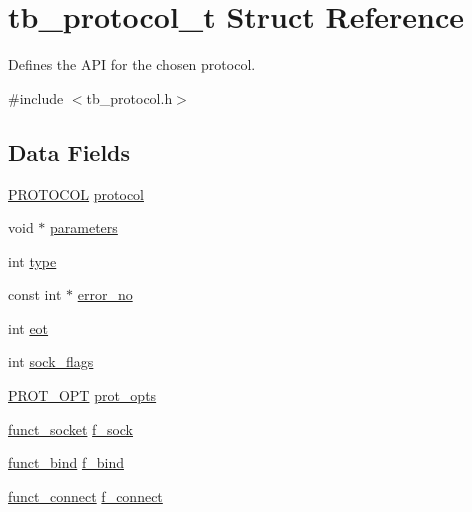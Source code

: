 \hypertarget{structtb__protocol__t}{\section{tb\-\_\-protocol\-\_\-t Struct Reference}
\label{structtb__protocol__t}
}


Defines the A\-P\-I for the chosen protocol.  




{\ttfamily \#include $<$tb\-\_\-protocol.\-h$>$}

\subsection*{Data Fields}
\begin{DoxyCompactItemize}
\item 
\hyperlink{tb__protocol_8h_a7a5bff1040fc154c510874327d44cc1a}{P\-R\-O\-T\-O\-C\-O\-L} \hyperlink{structtb__protocol__t_a0d2276cd987e688180eedab183cd503e}{protocol}
\item 
void $\ast$ \hyperlink{structtb__protocol__t_ae6c752a4c1c05c1fbd5623711f467712}{parameters}
\item 
int \hyperlink{structtb__protocol__t_ac765329451135abec74c45e1897abf26}{type}
\item 
const int $\ast$ \hyperlink{structtb__protocol__t_a154801a8a2d2211e5294ebaafb7ab904}{error\-\_\-no}
\item 
int \hyperlink{structtb__protocol__t_aba5b95ee17dc696379f1f4bc387cb075}{eot}
\item 
int \hyperlink{structtb__protocol__t_addb542b46765ba0bbea2dfce904440ab}{sock\-\_\-flags}
\item 
\hyperlink{tb__protocol_8h_ade248d634a0f3c9eca499d6fb268ce09}{P\-R\-O\-T\-\_\-\-O\-P\-T} \hyperlink{structtb__protocol__t_aa6fcad19412b8f80ba0dd887b3030010}{prot\-\_\-opts}
\item 
\hyperlink{tb__protocol_8h_aaf09f0db257e10041fe9e53585cf883d}{funct\-\_\-socket} \hyperlink{structtb__protocol__t_a48ae54bbd3f3cdfe397aba482cfcf7b5}{f\-\_\-sock}
\item 
\hyperlink{tb__protocol_8h_a14bfec37c8822819a01fb2e7f670096d}{funct\-\_\-bind} \hyperlink{structtb__protocol__t_a7e09c5e8d544ff3b707da30e813725a4}{f\-\_\-bind}
\item 
\hyperlink{tb__protocol_8h_a43255c3ce51eb275006d03290ea299d3}{funct\-\_\-connect} \hyperlink{structtb__protocol__t_a7d0f95f7e269f99385844c48a75f6532}{f\-\_\-connect}
\item 

\end{DoxyCompactItemize}
